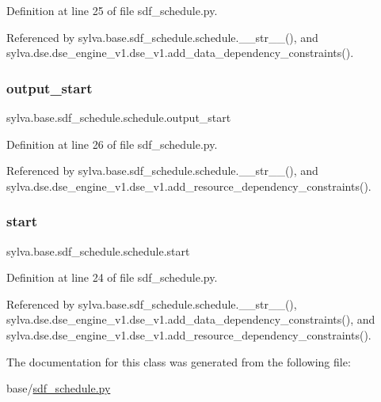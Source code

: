 Definition at line 25 of file sdf\+\_\+schedule.\+py.



Referenced by sylva.\+base.\+sdf\+\_\+schedule.\+schedule.\+\_\+\+\_\+str\+\_\+\+\_\+(), and sylva.\+dse.\+dse\+\_\+engine\+\_\+v1.\+dse\+\_\+v1.\+add\+\_\+data\+\_\+dependency\+\_\+constraints().

\mbox{\label{classsylva_1_1base_1_1sdf__schedule_1_1schedule_a57139c55f01d3c555a4d049ca85a5e8f}} 
\subsubsection{\texorpdfstring{output\+\_\+start}{output\_start}}
{\footnotesize\ttfamily sylva.\+base.\+sdf\+\_\+schedule.\+schedule.\+output\+\_\+start}



Definition at line 26 of file sdf\+\_\+schedule.\+py.



Referenced by sylva.\+base.\+sdf\+\_\+schedule.\+schedule.\+\_\+\+\_\+str\+\_\+\+\_\+(), and sylva.\+dse.\+dse\+\_\+engine\+\_\+v1.\+dse\+\_\+v1.\+add\+\_\+resource\+\_\+dependency\+\_\+constraints().

\mbox{\label{classsylva_1_1base_1_1sdf__schedule_1_1schedule_a790c6790e606e4f15520e042d390de55}} 
\subsubsection{\texorpdfstring{start}{start}}
{\footnotesize\ttfamily sylva.\+base.\+sdf\+\_\+schedule.\+schedule.\+start}



Definition at line 24 of file sdf\+\_\+schedule.\+py.



Referenced by sylva.\+base.\+sdf\+\_\+schedule.\+schedule.\+\_\+\+\_\+str\+\_\+\+\_\+(), sylva.\+dse.\+dse\+\_\+engine\+\_\+v1.\+dse\+\_\+v1.\+add\+\_\+data\+\_\+dependency\+\_\+constraints(), and sylva.\+dse.\+dse\+\_\+engine\+\_\+v1.\+dse\+\_\+v1.\+add\+\_\+resource\+\_\+dependency\+\_\+constraints().



The documentation for this class was generated from the following file\+:\begin{DoxyCompactItemize}
\item 
base/\hyperlink{sdf__schedule_8py}{sdf\+\_\+schedule.\+py}\end{DoxyCompactItemize}
